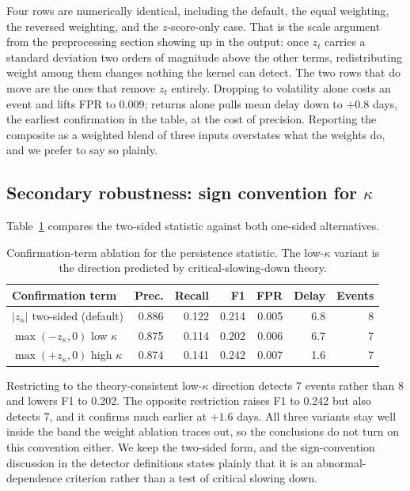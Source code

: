\documentclass[pdflatex,sn-mathphys-num,iicol]{sn-jnl}
\begin{document}
Four rows are numerically identical, including the default, the equal weighting, the reversed weighting, and the $z$-score-only case. That is the scale argument from the preprocessing section showing up in the output: once $z_t$ carries a standard deviation two orders of magnitude above the other terms, redistributing weight among them changes nothing the kernel can detect. The two rows that do move are the ones that remove $z_t$ entirely. Dropping to volatility alone costs an event and lifts FPR to 0.009; returns alone pulls mean delay down to $+0.8$ days, the earliest confirmation in the table, at the cost of precision. Reporting the composite as a weighted blend of three inputs overstates what the weights do, and we prefer to say so plainly.

\subsection{Secondary robustness: sign convention for $\kappa$}
\label{sec:kappasign}
Table~\ref{tab:kappasign} compares the two-sided statistic against both one-sided alternatives.

\begin{table}[t]
\centering
\caption{Confirmation-term ablation for the persistence statistic. The low-$\kappa$ variant is the direction predicted by critical-slowing-down theory.}
\label{tab:kappasign}
\scriptsize
\begin{tabular}{lrrrrrr}
\toprule
Confirmation term & Prec. & Recall & F1 & FPR & Delay & Events\\
\midrule
$|z_\kappa|$ two-sided (default) & 0.886 & 0.122 & 0.214 & 0.005 & 6.8 & 8\\
$\max(-z_\kappa,0)$ low $\kappa$ & 0.875 & 0.114 & 0.202 & 0.006 & 6.7 & 7\\
$\max(+z_\kappa,0)$ high $\kappa$ & 0.874 & 0.141 & 0.242 & 0.007 & 1.6 & 7\\
\bottomrule
\end{tabular}
\end{table}

Restricting to the theory-consistent low-$\kappa$ direction detects 7 events rather than 8 and lowers F1 to 0.202. The opposite restriction raises F1 to 0.242 but also detects 7, and it confirms much earlier at $+1.6$ days. All three variants stay well inside the band the weight ablation traces out, so the conclusions do not turn on this convention either. We keep the two-sided form, and the sign-convention discussion in the detector definitions states plainly that it is an abnormal-dependence criterion rather than a test of critical slowing down.
\end{document}
